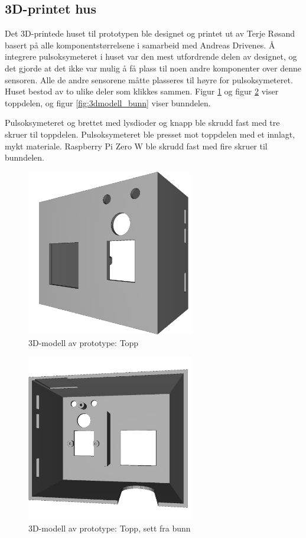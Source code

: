 \subsection{3D-printet hus}
Det 3D-printede huset til prototypen ble designet og printet ut av Terje Røsand basert på alle komponentstørrelsene i samarbeid
med Andreas Drivenes. Å integrere pulsoksymeteret i huset var den mest utfordrende delen av designet, og det gjorde at det ikke var
mulig å få plass til noen andre komponenter over denne sensoren. Alle de andre sensorene måtte plasseres til høyre for pulsoksymeteret.
Huset bestod av to ulike deler som klikkes sammen. Figur \ref{fig:3dmodell_topp1}
og figur \ref{fig:3dmodell_topp2} viser toppdelen, og figur \ref{fig:3dmodell_bunn} viser bunndelen.

Pulsoksymeteret og brettet med lysdioder og knapp ble skrudd fast med tre skruer til toppdelen. Pulsoksymeteret ble presset mot toppdelen
med et innlagt, mykt materiale. Raspberry Pi Zero W ble skrudd fast med fire skruer til bunndelen.

\begin{figure}
\includegraphics[width=0.65\textwidth, center]{fig/prototype/hoved_fra_topp}
\caption{3D-modell av prototype: Topp}
\label{fig:3dmodell_topp1}
\end{figure}
\begin{figure}

\includegraphics[width=0.65\textwidth, center]{fig/prototype/hoved_frabunn}
\caption{3D-modell av prototype: Topp, sett fra bunn}
\label{fig:3dmodell_topp2}
\end{figure}

